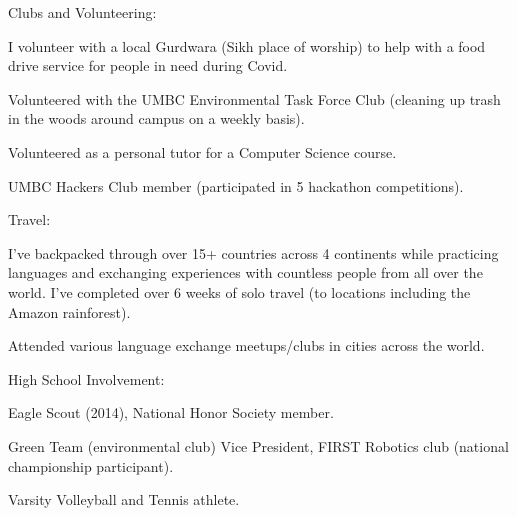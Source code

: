 
\begin{cventries}
  \cventry
    {Clubs and Volunteering:} %
    {} %
    {} %
    {} %
    {
      \begin{cvitems} %
      \item {I volunteer with a local Gurdwara (Sikh place of worship) to help with a food drive service for people in need during Covid.}
      \item {Volunteered with the UMBC Environmental Task Force Club (cleaning up trash in the woods around campus on a weekly basis).}
      \item {Volunteered as a personal tutor for a Computer Science course.}
      \item {UMBC Hackers Club member (participated in 5 hackathon competitions).}
      \end{cvitems}
    }

  \cventry
    {Travel:} %
    {} %
    {} %
    {} %
    {
      \begin{cvitems} %
      \item {I've backpacked through over 15+ countries across 4 continents while practicing languages and exchanging experiences with countless people from all over the world.  I've completed over 6 weeks of solo travel (to locations including the Amazon rainforest).}
      \item {Attended various language exchange meetups/clubs in cities across the world.}
      \end{cvitems}
    }


  \cventry
    {High School Involvement:} %
    {} %
    {} %
    {} %
    {
      \begin{cvitems} %
        \item {Eagle Scout (2014), National Honor Society member.}
        \item {Green Team (environmental club) Vice President, FIRST Robotics club (national championship participant).}
        \item {Varsity Volleyball and Tennis athlete.}
      \end{cvitems}
    }

\end{cventries}

